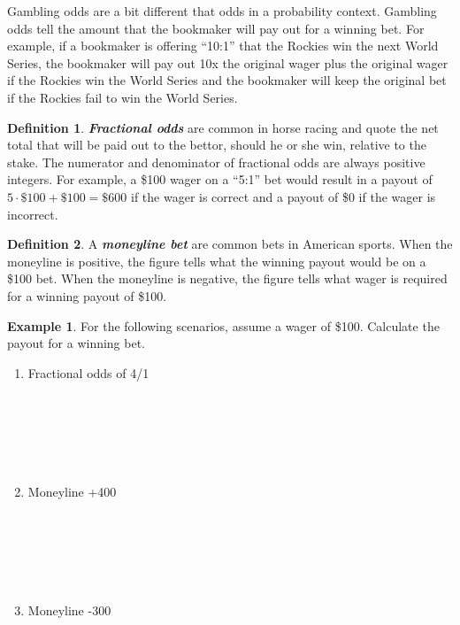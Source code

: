 \documentclass[
  11pt,
]{book}
\theoremstyle{definition}
\newtheorem{definition}{Definition}[chapter]
\theoremstyle{definition}
\newtheorem{example}{Example}[chapter]
\theoremstyle{definition}
\theoremstyle{definition}
\theoremstyle{remark}
\begin{document}
Gambling odds are a bit different that odds in a probability context. Gambling odds tell the amount that the bookmaker will pay out for a winning bet. For example, if a bookmaker is offering ``10:1'' that the Rockies win the next World Series, the bookmaker will pay out 10x the original wager plus the original wager if the Rockies win the World Series and the bookmaker will keep the original bet if the Rockies fail to win the World Series.

\begin{definition}
\textbf{\emph{Fractional odds}} are common in horse racing and quote the net total that will be paid out to the bettor, should he or she win, relative to the stake. The numerator and denominator of fractional odds are always positive integers. For example, a \$100 wager on a ``5:1'' bet would result in a payout of \(5 \cdot \$100 + \$100 = \$600\) if the wager is correct and a payout of \$0 if the wager is incorrect.
\end{definition}

\begin{definition}
A \textbf{\emph{moneyline bet}} are common bets in American sports. When the moneyline is positive, the figure tells what the winning payout would be on a \$100 bet. When the moneyline is negative, the figure tells what wager is required for a winning payout of \$100.
\end{definition}

\begin{example}
For the following scenarios, assume a wager of \$100. Calculate the payout for a winning bet.
\end{example}

\begin{enumerate}
\def\labelenumi{(\alph{enumi})}
\item
  Fractional odds of 4/1\\
  \strut \\
  \strut \\
  \strut \\
\item
  Moneyline +400\\
  \strut \\
  \strut \\
  \strut \\
\item
  Moneyline -300\\
  \strut \\
  \strut \\
  \strut \\
\end{enumerate}
\end{document}
